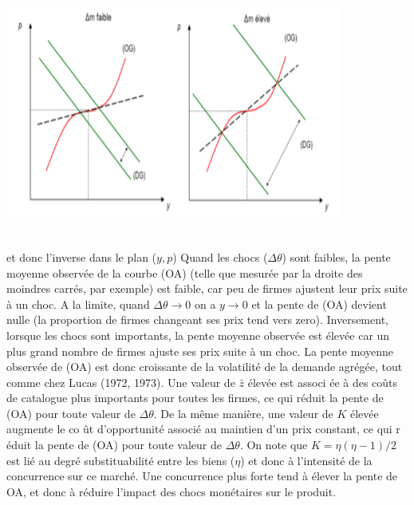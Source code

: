 \documentclass[11pt,a4paper]{article}
\begin{document}
\begin{enumerate}
\begin{center}
\includegraphics[width=11cm, height=8cm]{pc3_assets/3.png}
\end{center}


\bigskip
et donc l'inverse dans le plan ($y,p$)\bigskip \newline
Quand les chocs ($\Delta \theta$) sont faibles, la pente moyenne observ\'{e}e de
la courbe (OA) (telle que mesur\'{e}e par la droite des moindres carr\'{e}s,
par exemple) est faible, car peu de firmes ajustent leur prix suite \`{a} un
choc. A la limite, quand $\Delta \theta\rightarrow 0$ on a $y\rightarrow 0$ et la
pente de (OA) devient nulle (la proportion de firmes changeant ses prix tend
vers zero). Inversement, lorsque les chocs sont importants, la pente moyenne
observ\'{e}e est \'{e}lev\'{e}e car un plus grand nombre de firmes ajuste
ses prix suite \`{a} un choc. La pente moyenne observ\'{e}e de (OA) est donc
croissante de la volatilit\'{e} de la demande agr\'{e}g\'{e}e, tout comme
chez Lucas (1972, 1973). Une valeur de $\bar{z}$ \'{e}lev\'{e}e est associ%
\'{e}e \`{a} des co\^{u}ts de catalogue plus importants pour toutes les
firmes, ce qui r\'{e}duit la pente de (OA) pour toute valeur de $\Delta \theta $.
De la m\^{e}me mani\`{e}re, une valeur de $K$ \'{e}lev\'{e}e augmente le co%
\^{u}t d'opportunit\'{e} associ\'{e} au maintien d'un prix constant, ce qui r%
\'{e}duit la pente de (OA) pour toute valeur de $\Delta \theta$. On note que $%
K=\eta \left( \eta -1\right) /2$ est li\'{e} au degr\'{e} substituabilit\'{e}
entre les biens ($\eta $) et donc \`{a} l'intensit\'{e} de la concurrence
sur ce march\'{e}. Une concurrence plus forte tend \`{a} \'{e}lever la pente
de OA, et donc \`{a} r\'{e}duire l'impact des chocs mon\'{e}taires sur le
produit.\newline






\end{enumerate}
\end{document}
